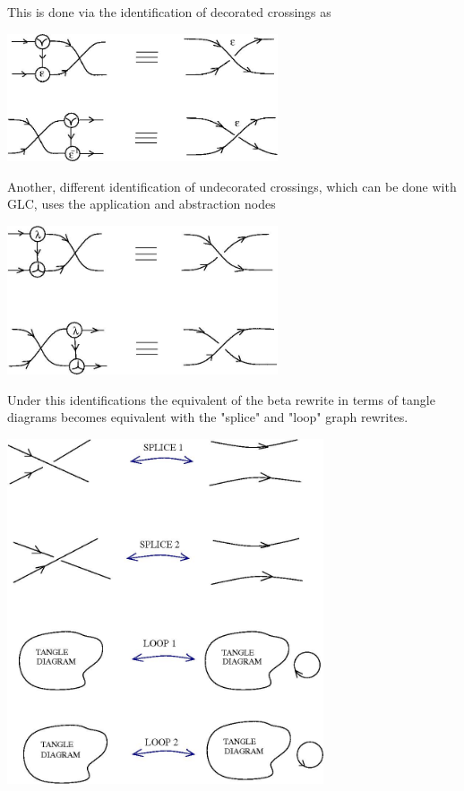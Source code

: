 \documentclass{article}
\begin{document}
 This is done via the identification of decorated crossings as
\vspace{.5cm}
 
\centerline{\includegraphics[width=0.6\textwidth]{../img/glc/cross_emer_1.jpg}
}
\vspace{.5cm}

Another, different identification of undecorated crossings, which can be done with GLC, uses the application and abstraction nodes



\vspace{.5cm}
 
\centerline{\includegraphics[width=0.6\textwidth]{../img/glc/cross_beta_1.jpg}
}
\vspace{.5cm}

 Under this identifications the equivalent of the beta rewrite in terms of tangle diagrams becomes equivalent with the "splice" and "loop" graph rewrites.

\vspace{.5cm}
 
\centerline{\includegraphics[width=0.7\textwidth]{../img/glc/splice_1.jpg}
}
\end{document}
